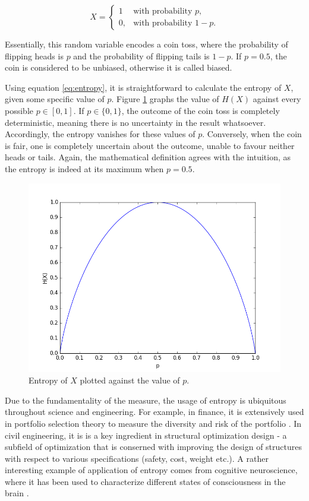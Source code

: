\documentclass[12pt]{article}
\begin{document}
$$X = \begin{cases} 1 & \mbox{with probability } p, \\ 0, & \mbox{with probability } 1-p. \end{cases}$$

Essentially, this random variable encodes a coin toss, where the probability of flipping heads is $p$ and the probability of flipping tails is $1-p$. If $p=0.5$, the coin is considered to be unbiased, otherwise it is called biased.

Using equation \ref{eq:entropy}, it is straightforward to calculate the entropy of $X$, given some specific value of $p$. Figure \ref{fig:entropy} graphs the value of $H(X)$ against every possible $p \in \left[ 0, 1 \right]$. If $p \in \{0, 1\}$, the outcome of the coin toss is completely deterministic, meaning there is no uncertainty in the result whatsoever. Accordingly, the entropy vanishes for these values of $p$. Conversely, when the coin is fair, one is completely uncertain about the outcome, unable to favour neither heads or tails. Again, the mathematical definition agrees with the intuition, as the entropy is indeed at its maximum when $p = 0.5$.

\begin{figure} [h]
\begin{center}
\includegraphics[width=\textwidth]{entropy}
\caption{Entropy of $X$ plotted against the value of $p$.}
\label{fig:entropy}
\end{center}
\end{figure}

Due to the fundamentality of the measure, the usage of entropy is ubiquitous throughout science and engineering. For example, in finance, it is extensively used in portfolio selection theory to measure the diversity and risk of the portfolio \cite{entropy-finance}. In civil engineering, it is is a key ingredient in structural optimization design \cite{entropy-civil-eng} - a subfield of optimization that is conserned with improving the design of structures with respect to various specifications (safety, cost, weight etc.). A rather interesting example of application of entropy comes from cognitive neuroscience, where it has been used to characterize different states of consciousness in the brain \cite{entropy-consciousness}.
\end{document}
